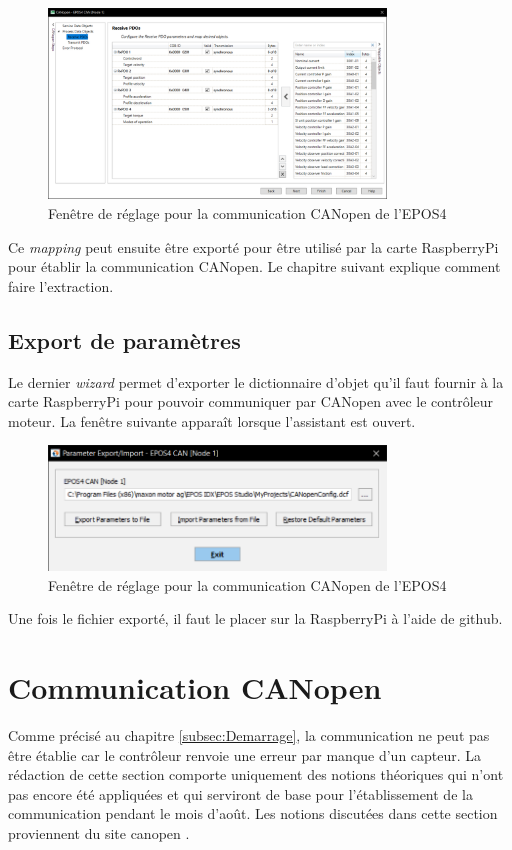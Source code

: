 \begin{figure}[H]
    \centering
    \includegraphics[width = 0.8\textwidth]{assets/figures/ParamCANopen.png}
    \caption{Fenêtre de réglage pour la communication CANopen de l'EPOS4}
    \label{fig:ParamCAN}
\end{figure}

Ce \textit{mapping} peut ensuite être exporté pour être utilisé par la carte RaspberryPi pour établir la communication CANopen. Le chapitre suivant
explique comment faire l'extraction.

\subsection{Export de paramètres}
Le dernier \textit{\gls{wizard}} permet d'exporter le dictionnaire d'objet qu'il faut fournir à la carte RaspberryPi pour pouvoir communiquer par
CANopen avec le contrôleur moteur. La fenêtre suivante apparaît lorsque l'assistant est ouvert.

\begin{figure}[H]
    \centering
    \includegraphics[width = 0.8\textwidth]{assets/figures/ParamExport.png}
    \caption{Fenêtre de réglage pour la communication CANopen de l'EPOS4}
    \label{fig:ParamExport}
\end{figure}

Une fois le fichier exporté, il faut le placer sur la RaspberryPi à l'aide de github.

\section{Communication CANopen}
Comme précisé au chapitre \ref{subsec:Demarrage}, la communication ne peut pas être établie car le contrôleur renvoie une erreur par manque d'un
capteur. La rédaction de cette section comporte uniquement des notions théoriques qui n'ont pas encore été appliquées et qui serviront de base
pour l'établissement de la communication pendant le mois d'août. Les notions discutées dans cette section proviennent du site canopen \cite{canopen}.\\

